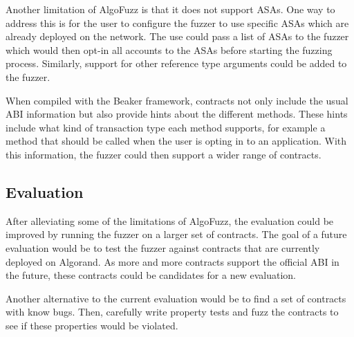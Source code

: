 Another limitation of AlgoFuzz is that it does not support \acp{ASA}.
One way to address this is for the user to configure the fuzzer to use specific \acp{ASA} which are already deployed on the network.
The use could pass a list of \acp{ASA} to the fuzzer which would then opt-in all accounts to the \acp{ASA} before starting the fuzzing process.
Similarly, support for other reference type arguments could be added to the fuzzer.


When compiled with the Beaker framework, contracts not only include the usual \ac{ABI} information but also provide hints about the different methods.
These hints include what kind of transaction type each method supports, for example a method that should be called when the user is opting in to an application.
With this information, the fuzzer could then support a wider range of contracts.

\subsection*{Evaluation}
After alleviating some of the limitations of AlgoFuzz, the evaluation could be improved by running the fuzzer on a larger set of contracts.
The goal of a future evaluation would be to test the fuzzer against contracts that are currently deployed on Algorand.
As more and more contracts support the official \ac{ABI} in the future, these contracts could be candidates for a new evaluation.

Another alternative to the current evaluation would be to find a set of contracts with know bugs.
Then, carefully write property tests and fuzz the contracts to see if these properties would be violated.